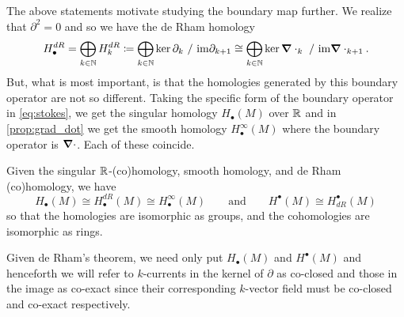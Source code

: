 \documentclass{article}
\begin{document}
The above statements motivate studying the boundary map further. We realize that $\partial^2=0$ and so we have the de Rham homology
\begin{equation}
H_\bullet^{dR} = \bigoplus_{k\in \mathbb{N}} H_k^{dR} \coloneqq \bigoplus_{k\in \mathbb{N}} \ker \partial_k ~/~ \mathrm{im} \partial_{k+1}\cong \bigoplus_{k\in \mathbb{N}} \ker \boldsymbol{\nabla} \cdot_k ~/~ \mathrm{im} \boldsymbol{\nabla} \cdot_{k+1}. 
\end{equation}
But, what is most important, is that the homologies generated by this boundary operator are not so different. Taking the specific form of the boundary operator in \cref{eq:stokes}, we get the singular homology $H_\bullet(M)$ over $\mathbb{R}$ and in \cref{prop:grad_dot} we get the smooth homology $H^\infty_\bullet(M)$ where the boundary operator is $\boldsymbol{\nabla} \cdot$. Each of these coincide.
\begin{theorem}
    Given the singular $\mathbb{R}$-(co)homology, smooth homology, and de Rham (co)homology, we have 
\begin{equation}
    H_\bullet(M)\cong H_\bullet^{dR}(M) \cong H_\bullet^\infty(M) \qquad \textrm{and} \qquad H^\bullet(M) \cong H^\bullet_{dR}(M)
\end{equation}
so that the homologies are isomorphic as groups, and the cohomologies are isomorphic as rings.
\end{theorem}
Given de Rham's theorem, we need only put $H_\bullet(M)$ and $H^\bullet(M)$ and henceforth we will refer to $k$-currents in the kernel of $\partial$ as co-closed and those in the image as co-exact since their corresponding $k$-vector field must be co-closed and co-exact respectively.
\end{document}
